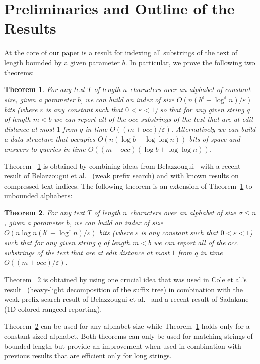 \documentclass{article}
\newcommand{\?}{\mskip1.5mu}
\renewcommand{\epsilon}{\varepsilon}
\newtheorem{theorem}{Theorem}
\begin{document}
\section{Preliminaries and Outline of the Results}
At the core of our paper is a result for indexing all substrings of the text of length bounded by a given parameter $b$. In particular, we prove the following two theorems: 
\begin{theorem}
\label{constant_fix_theorem}
For any text $T$ of length $n$ characters over an alphabet of constant size, given a parameter $b$, we can build an index of size $O(n(b^\epsilon+\log^\epsilon n)/\epsilon)$ bits  (where $\epsilon$ is any constant such that $0<\epsilon<1$) so that for any given string $q$ of length $m<b$ we can report all of the $occ$ substrings of the text that are at edit distance at most $1$ from $q$ in time $O((m+occ)/\epsilon)$. Alternatively we can build a data structure that occupies $O(n(\log b+\log\log n))$ bits of space and answers to queries in time $O((m+occ)(\log b+\log\log n))$. 
\end{theorem}
Theorem ~\ref{constant_fix_theorem} is obtained by combining ideas from Belazzougui~\cite{B09} with a recent result of Belazzougui et al.~\cite{BBPV10} (weak prefix search) and with known results on compressed text indices. 
The following theorem is an extension of Theorem~\ref{constant_fix_theorem} to unbounded alphabets:  
\begin{theorem}
\label{arb_fix_theorem}
For any text $T$ of length $n$ characters over an alphabet of size $\sigma\leq n$, given a parameter $b$, we can build an index of size $O(n\log n(b^\epsilon+\log^\epsilon n)/\epsilon)$ bits (where $\epsilon$ is any constant such that $0<\epsilon<1$) such that for any given string $q$ of length $m<b$ we can report all of the $occ$ substrings of the text that are at edit distance at most $1$ from $q$ in time $O((m+occ)/\epsilon)$. 
\end{theorem}
Theorem ~\ref{arb_fix_theorem} is obtained by using one crucial idea that was used in Cole et al.'s result~\cite{CGL04} (heavy-light decomposition of the suffix tree) in combination with the weak prefix search result of Belazzougui et al.~\cite{BBPV10} and a recent result of Sadakane~\cite{Sa07} (1D-colored rangeed reporting). 

Theorem~\ref{arb_fix_theorem} can be used for any alphabet size while Theorem~\ref{constant_fix_theorem} holds only for a constant-sized alphabet. Both theorems can only be used for matching strings of bounded length but provide an improvement when used in combination with previous results that are efficient only for long strings.
\end{document}
